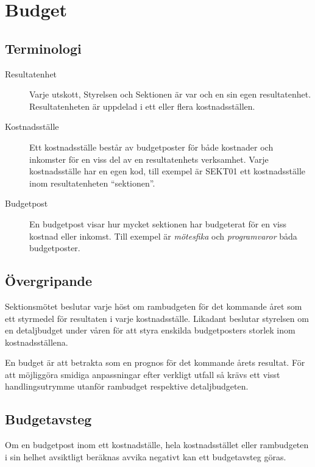 \documentclass{dsekprotokoll}
\begin{document}
\section{Budget}

\subsection{Terminologi}

\begin{description}
  \item[Resultatenhet] Varje utskott, Styrelsen och Sektionen är var och en sin
    egen resultatenhet. Resultatenheten är uppdelad i ett eller flera
    kostnadsställen.
  \item[Kostnadsställe] Ett kostnadsställe består av budgetposter för både
    kostnader och inkomster för en viss del av en resultatenhets
    verksamhet. Varje kostnadsställe har en egen kod, till exempel är SEKT01 ett
    kostnadsställe inom resultatenheten ``sektionen''.
  \item[Budgetpost] En budgetpost visar hur mycket sektionen har budgeterat för
    en viss kostnad eller inkomst. Till exempel är \textit{mötesfika} och
    \textit{programvaror} båda budgetposter.
\end{description}

\subsection{Övergripande}
Sektionsmötet beslutar varje höst om rambudgeten för det kommande året som ett
styrmedel för resultaten i varje kostnadsställe. Likadant beslutar styrelsen
om en detaljbudget under våren för att styra enskilda budgetposters storlek inom
kostnadsställena.

En budget är att betrakta som en prognos för det kommande årets resultat. För
att möjliggöra smidiga anpassningar efter verkligt utfall så krävs ett visst
handlingsutrymme utanför rambudget respektive detaljbudgeten.

\subsection{Budgetavsteg}
Om en budgetpost inom ett kostnadställe, hela kostnadsstället eller rambudgeten
i sin helhet avsiktligt beräknas avvika negativt kan ett budgetavsteg göras.
\end{document}
